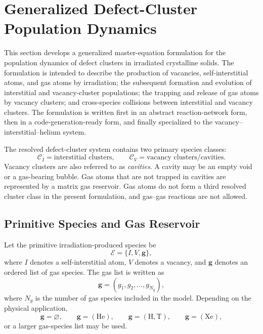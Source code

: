 \section{Generalized Defect-Cluster Population Dynamics}
\label{sec:general_defect_cluster_dynamics}

This section develops a generalized master-equation formulation for the
population dynamics of defect clusters in irradiated crystalline solids. The
formulation is intended to describe the production of vacancies,
self-interstitial atoms, and gas atoms by irradiation; the subsequent formation
and evolution of interstitial and vacancy-cluster populations; the trapping and
release of gas atoms by vacancy clusters; and cross-species collisions between
interstitial and vacancy clusters. The formulation is written first in an
abstract reaction-network form, then in a code-generation-ready form, and
finally specialized to the vacancy--interstitial--helium system.

The resolved defect-cluster system contains two primary species classes:
\begin{equation}
    \mathcal{C}_I
    =
    \text{interstitial clusters},
    \qquad
    \mathcal{C}_V
    =
    \text{vacancy clusters/cavities}.
\end{equation}
Vacancy clusters are also referred to as \emph{cavities}. A cavity may be an
empty void or a gas-bearing bubble. Gas atoms that are not trapped in cavities
are represented by a matrix gas reservoir. Gas atoms do not form a third
resolved cluster class in the present formulation, and gas--gas reactions are
not allowed.

\subsection{Primitive Species and Gas Reservoir}
\label{sec:primitive_species_and_gas_reservoir}

Let the primitive irradiation-produced species be
\begin{equation}
    \mathcal{E}=\{I,V,\mathbf{g}\},
\end{equation}
where $I$ denotes a self-interstitial atom, $V$ denotes a vacancy, and
$\mathbf{g}$ denotes an ordered list of gas species. The gas list is written as
\begin{equation}
    \mathbf{g}
    =
    (g_1,g_2,\ldots,g_{N_g}),
    \label{eq:gas_species_list}
\end{equation}
where $N_g$ is the number of gas species included in the model. Depending on
the physical application,
\begin{equation}
    \mathbf{g}=\varnothing,
    \qquad
    \mathbf{g}=(\mathrm{He}),
    \qquad
    \mathbf{g}=(\mathrm{H},\mathrm{T}),
    \qquad
    \mathbf{g}=(\mathrm{Xe}),
\end{equation}
or a larger gas-species list may be used.

